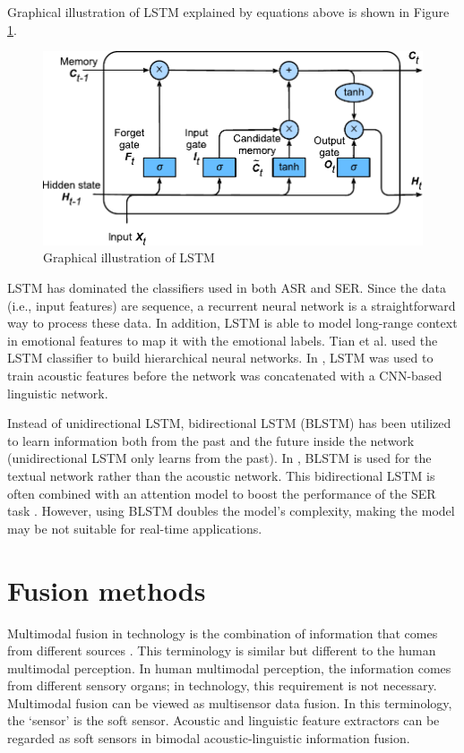 Graphical illustration of LSTM explained by equations above is shown in Figure
\ref{fig:lstm}.

\begin{figure}[!hb]
\centering
\includegraphics[width=4.5in]{../fig/lstm_3.pdf}
\caption{Graphical illustration of LSTM \cite{Zhang2020}}
\label{fig:lstm}
\end{figure}

LSTM has dominated the classifiers used in both ASR and SER. Since the data
(i.e., input features) are sequence, a recurrent neural network is a
straightforward way to process these data. In addition, LSTM is able to model
long-range context in emotional features to map it with the emotional labels.
Tian et al. \cite{Tian2015} used the LSTM classifier to build hierarchical
neural networks. In \cite{Cho2018}, LSTM was used to train acoustic features
before the network was concatenated with a CNN-based linguistic network.

Instead of unidirectional LSTM, bidirectional LSTM (BLSTM) has been utilized to
learn information both from the past and the future inside the network
(unidirectional LSTM only learns from the past). In \cite{Cai2019}, BLSTM is
used for the textual network rather than the acoustic network. This
bidirectional LSTM is often combined with an attention model to boost the
performance of the SER task \cite{Atmaja2019}. However, using BLSTM doubles the
model's complexity, making the model may be not suitable for real-time
applications.

\section{Fusion methods} 
Multimodal fusion in technology is the combination of information that comes
from different sources \cite{Khaleghi2013}. This terminology is similar but
different to the human multimodal perception. In human multimodal perception,
the information comes from different sensory organs; in technology, this
requirement is not necessary.  Multimodal fusion can be viewed as multisensor
data fusion. In this terminology, the `sensor' is the soft sensor. Acoustic and
linguistic feature extractors can be regarded as soft sensors in bimodal
acoustic-linguistic information fusion.

